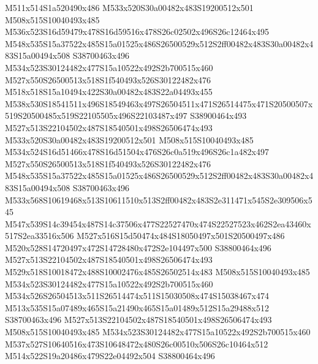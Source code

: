 \documentclass{article}
\begin{document}
\begin{multicols}{2}
M511x514S1a520490x486 M533x520S30a00482x483S19200512x501 M508x515S10040493x485 M536x523S16d59479x478S16d59516x478S26c02502x496S26c12464x495 M548x535S15a37522x485S15a01525x486S26500529x512S2ff00482x483S30a00482x483S15a00494x508 S38700463x496 M534x523S30124482x477S15a10522x492S2b700515x460 M527x550S26500513x518S1f540493x526S30122482x476 M518x518S15a10494x422S30a00482x483S22a04493x455 M538x530S18541511x496S18549463x497S26504511x471S26514475x471S20500507x519S20500485x519S22105505x496S22103487x497 S38900464x493 M527x513S22104502x487S18540501x498S26506474x493 M533x520S30a00482x483S19200512x501 M508x515S10040493x485 M534x524S16d51466x478S16d51504x476S26c0a519x496S26c1a482x497 M527x550S26500513x518S1f540493x526S30122482x476 M548x535S15a37522x485S15a01525x486S26500529x512S2ff00482x483S30a00482x483S15a00494x508 S38700463x496 M533x568S10619468x513S10611510x513S2ff00482x483S2e311471x545S2e309506x545 M547x539S14c39454x487S14c37506x477S22527470x474S22527523x462S2ea43460x517S2ea33516x506 M527x516S15d50474x484S18050497x501S20500497x486 M520x528S14720497x472S14728480x472S2e104497x500 S38800464x496 M527x513S22104502x487S18540501x498S26506474x493 M529x518S10018472x488S10002476x485S26502514x483 M508x515S10040493x485 M534x523S30124482x477S15a10522x492S2b700515x460 M534x526S26504513x511S26514474x511S15030508x474S15038467x474 M513x535S15a07489x465S15a21490x465S15a01489x512S15a29488x512 S38700463x496 M527x513S22104502x487S18540501x498S26506474x493 M508x515S10040493x485 M534x523S30124482x477S15a10522x492S2b700515x460 M537x527S10640516x473S10648472x480S26c00510x506S26c10464x512 M514x522S19a20486x479S22e04492x504 S38800464x496


\end{multicols}
\end{document}
